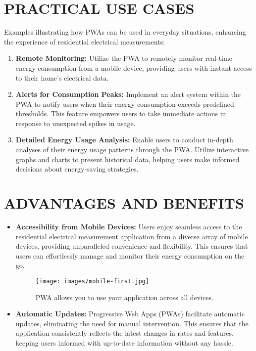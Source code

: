\documentclass{article}
\begin{document}
\begin{multicols}{2}
\section*{PRACTICAL USE CASES}
Examples illustrating how PWAs can be used in everyday situations, enhancing the experience of residential electrical measurements:

\begin{enumerate}
    \item \textbf{Remote Monitoring:} Utilize the PWA to remotely monitor real-time energy consumption from a mobile device, providing users with instant access to their home's electrical data.
    
    \item \textbf{Alerts for Consumption Peaks:} Implement an alert system within the PWA to notify users when their energy consumption exceeds predefined thresholds. This feature empowers users to take immediate actions in response to unexpected spikes in usage.
    
    \item \textbf{Detailed Energy Usage Analysis:} Enable users to conduct in-depth analyses of their energy usage patterns through the PWA. Utilize interactive graphs and charts to present historical data, helping users make informed decisions about energy-saving strategies.
\end{enumerate}

\section*{ADVANTAGES AND BENEFITS}
\begin{itemize}
    \item \textbf{Accessibility from Mobile Devices:} Users enjoy seamless access to the residential electrical measurement application from a diverse array of mobile devices, providing unparalleled convenience and flexibility. This ensures that users can effortlessly manage and monitor their energy consumption on the go.
    
    \begin{figure}[H]
        \centering
        \texttt{[image: images/mobile-first.jpg]}  %
        \caption{PWA allows you to use your application across all devices.}
    \end{figure}

    \item \textbf{Automatic Updates:} Progressive Web Apps (PWAs) facilitate automatic updates, eliminating the need for manual intervention. This ensures that the application consistently reflects the latest changes in rates and features, keeping users informed with up-to-date information without any hassle.
    

\end{itemize}
\end{multicols}
\end{document}
